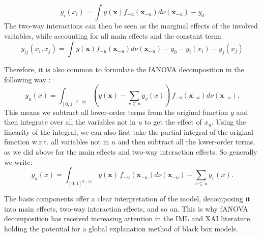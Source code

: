 \begin{equation}
    y_i(x_i) = \int y(\boldsymbol{x}) f_{-u}(\boldsymbol{x}_{-u}) d\nu (\boldsymbol{x}_{-u}) - y_0
    \label{eq:main_effect_rearranged}
\end{equation}
The two-way interactions can then be seen as the marginal effects of the involved variables, while accounting for all main effects and the constant term:
\begin{equation}
    y_{ij}(x_i,x_j) = \int y(\boldsymbol{x}) f_{-u}(\boldsymbol{x}_{-u}) d\nu (\boldsymbol{x}_{-u}) - y_0 - y_i(x_i) - y_j(x_j) 
    \label{eq:interaction_effects}
\end{equation}

Therefore, it is also common to formulate the fANOVA decomposition in the following way \citep{hooker2007,hooker2004}:
\begin{equation}
    y_u(x) = \int_{[0,1]^{d - |u|}} \left( y(\boldsymbol{x}) - \sum_{v \subsetneq u} y_v(x) \right) \, f_{-u}(\boldsymbol{x}_{-u}) d\nu (\boldsymbol{x}_{-u}).
\end{equation}
This means we subtract all lower-order terms from the original function $y$ and then integrate over all the variables not in $u$ to get the effect of $x_u$. Using the linearity of the integral, we can also first take the partial integral of the original function w.r.t. all variables not in $u$ and then subtract all the lower-order terms, as we did above for the main effects and two-way interaction effects. So generally we write:
\begin{equation}
    y_u(x) = \int_{[0,1]^{d - |u|}} y(\boldsymbol{x}) \, f_{-u}(\boldsymbol{x}_{-u}) d\nu (\boldsymbol{x}_{-u}) - \sum_{v \subsetneq u} y_v(x).
\end{equation}

The basis components offer a clear interpretation of the model, decomposing it into main effects, two-way interaction effects, and so on. This is why fANOVA decomposition has received increasing attention in the IML and XAI literature, holding the potential for a global explanation method of black box models.\par

